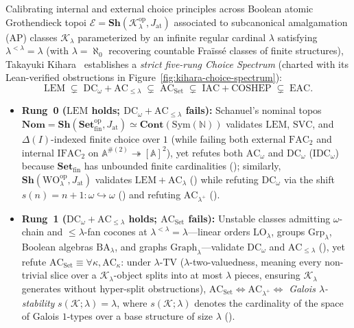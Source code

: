 Calibrating internal and external choice principles across Boolean atomic Grothendieck topoi $\mathcal{E} = \mathbf{Sh}(\mathcal{K}_\lambda^{\mathrm{op}}, J_{\mathrm{at}})$ associated to subcanonical amalgamation ($\mathrm{AP}$) classes $\mathcal{K}_\lambda$ parameterized by an infinite regular cardinal $\lambda$ satisfying $\lambda^{<\lambda} = \lambda$ (with $\lambda = \aleph_0$ recovering countable Fra\"iss\'e classes of finite structures), Takayuki Kihara~\cite[Sections~3, 5--8, and Table~1]{Kihara26} establishes a \emph{strict five-rung Choice Spectrum} (charted with its Lean-verified obstructions in Figure~\ref{fig:kihara-choice-spectrum}):
\[
  \mathrm{LEM} \;\subsetneq\; \mathrm{DC}_\omega + \mathrm{AC}_{\le \lambda} \;\subsetneq\; \mathrm{AC}_{\mathrm{Set}} \;\subsetneq\; \mathrm{IAC} + \mathrm{COSHEP} \;\subsetneq\; \mathrm{EAC}.
\]
\begin{itemize}
  \item \textbf{Rung~0 ($\mathrm{LEM}$ holds; $\mathrm{DC}_\omega + \mathrm{AC}_{\le \lambda}$ fails):} Schanuel's nominal topos $\mathbf{Nom} = \mathbf{Sh}(\mathbf{Set}_{\mathrm{fin}}^{\mathrm{op}}, J_{\mathrm{at}}) \simeq \mathbf{Cont}(\mathrm{Sym}(\mathbb{N}))$ validates $\mathrm{LEM}$, $\mathrm{SVC}$, and $\Delta(I)$-indexed finite choice over $1$ (while failing both external $\mathrm{FAC}_2$ and internal $\mathrm{IFAC}_2$ on $\mathbb{A}^{\#(2)} \twoheadrightarrow [\mathbb{A}]^2$), yet refutes both $\mathrm{AC}_\omega$ and $\mathrm{DC}_\omega$ ($\mathrm{IDC}_\omega$) because $\mathbf{Set}_{\mathrm{fin}}$ has unbounded finite cardinalities (\cite[Theorem~7.9]{Kihara26}); similarly, $\mathbf{Sh}(\mathrm{WO}_\lambda^{\mathrm{op}}, J_{\mathrm{at}})$ validates $\mathrm{LEM} + \mathrm{AC}_\lambda$ (\cite[Proposition~7.8]{Kihara26}) while refuting $\mathrm{DC}_\omega$ via the shift $s(n) = n + 1 : \omega \hookrightarrow \omega$ (\cite[Proposition~7.5]{Kihara26}) and refuting $\mathrm{AC}_{\lambda^+}$ (\cite[Proposition~7.7]{Kihara26}).
  \item \textbf{Rung~1 ($\mathrm{DC}_\omega + \mathrm{AC}_{\le \lambda}$ holds; $\mathrm{AC}_{\mathrm{Set}}$ fails):} Unstable classes admitting $\omega$-chain and $\le \lambda$-fan cocones at $\lambda^{<\lambda} = \lambda$---linear orders $\mathrm{LO}_\lambda$, groups $\mathrm{Grp}_\lambda$, Boolean algebras $\mathrm{BA}_\lambda$, and graphs $\mathrm{Graph}_\lambda$---validate $\mathrm{DC}_\omega$ and $\mathrm{AC}_{\le \lambda}$ (\cite[Theorems~3.3--3.4 and Table~1]{Kihara26}), yet refute $\mathrm{AC}_{\mathrm{Set}} \equiv \forall \kappa, \mathrm{AC}_\kappa$: under $\lambda$-$\mathrm{TV}$ ($\lambda$-two-valuedness, meaning every non-trivial slice over a $\mathcal{K}_\lambda$-object splits into at most $\lambda$ pieces, ensuring $\mathcal{K}_\lambda$ generates without hyper-split obstructions), $\mathrm{AC}_{\mathrm{Set}} \iff \mathrm{AC}_{\lambda^+} \iff$ \emph{Galois $\lambda$-stability} $s(\mathcal{K}; \lambda) = \lambda$, where $s(\mathcal{K}; \lambda)$ denotes the cardinality of the space of Galois $1$-types over a base structure of size $\lambda$ (\cite[Theorems~5.6 and~5.10; see also Theorem~6.34 for Polish groups]{Kihara26}).

\end{itemize}

